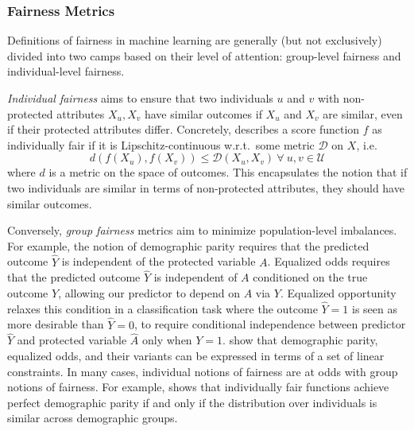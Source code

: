     \subsubsection{Fairness Metrics}  \label{sec:intro_fairmetrics}
    
        Definitions of fairness in machine learning are generally (but not exclusively) divided into two camps based on their level of attention: group-level fairness and individual-level fairness.
        
        \emph{Individual fairness} aims to ensure that two individuals $u$ and $v$ with non-protected attributes $X_u, X_v$ have similar outcomes if $X_u$ and $X_v$ are similar, even if their protected attributes differ. Concretely, \citep{dwork2012fairness} describes a score function $f$ as individually fair if it is Lipschitz-continuous w.r.t.\ some metric $\mathcal{D}$ on $X$, i.e.\
        \begin{equation}d(f(X_u), f(X_v)) \le \mathcal{D}(X_u, X_v) ~\forall~ u, v \in \mathcal{U}\label{eqn:IndFair}\end{equation}
        where $d$ is a metric on the space of outcomes. This encapsulates the notion that if two individuals are similar in terms of non-protected attributes, they should have similar outcomes.
        
        Conversely, \emph{group fairness} metrics aim to minimize population-level imbalances. For example, the notion of demographic parity \citep{dwork2012fairness} requires that the predicted outcome $\hat{Y}$ is independent of the protected variable $A$. Equalized odds \citep{HarPriSre2016} requires that the predicted outcome $\hat{Y}$ is independent of $A$ conditioned on the true outcome $Y$, allowing our predictor to depend on $A$ via $Y$. Equalized opportunity \citep{HarPriSre2016} relaxes this condition in a classification task where the outcome $\hat{Y}=1$ is seen as more desirable than $\hat{Y}=0$, to require conditional independence between predictor $\hat{Y}$ and protected variable $\hat{A}$ only when $Y=1$. \cite{AgaBeyDudLanWal2018} show that demographic parity, equalized odds, and their variants can be expressed in terms of a set of linear constraints.  In many cases, individual notions of fairness are at odds with group notions of fairness. For example, \cite{dwork2012fairness} shows that individually fair functions achieve perfect demographic parity if and only if the distribution over individuals is similar across demographic groups.



